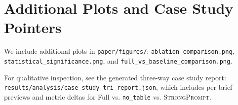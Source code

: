 \section{Additional Plots and Case Study Pointers}

We include additional plots in \texttt{paper/figures/}:
\texttt{ablation\_comparison.png},
\texttt{statistical\_significance.png},
and \texttt{full\_vs\_baseline\_comparison.png}.

For qualitative inspection, see the generated three-way case study report:
\texttt{results/analysis/case\_study\_tri\_report.json}, which includes per-brief previews and metric deltas for
Full vs. \texttt{no\_table} vs. \textsc{StrongPrompt}.


